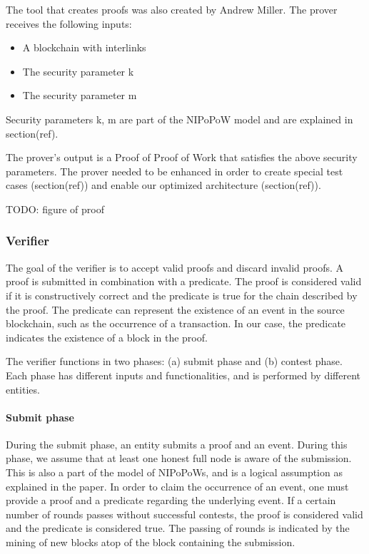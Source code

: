 The tool that creates proofs was also created by Andrew Miller. The
prover receives the following inputs:

\begin{itemize}
    \item
        A blockchain with interlinks
    \item
        The security parameter k
    \item
        The security parameter m
\end{itemize}

Security parameters k, m are part of the NIPoPoW model and are
explained in section(ref).

The prover’s output is a Proof of Proof of Work that satisfies the
above security parameters. The prover needed to be enhanced in order
to create special test cases (section(ref)) and enable our optimized
architecture (section(ref)).

TODO: figure of proof

\subsubsection{Verifier}

The goal of the verifier is to accept valid proofs and discard invalid
proofs. A proof is submitted in combination with a predicate. The
proof is considered valid if it is constructively correct and the
predicate is true for the chain described by the proof. The predicate
can represent the existence of an event in the source blockchain, such
as the occurrence of a transaction. In our case, the predicate
indicates the existence of a block in the proof.

The verifier functions in two phases: (a) submit phase and (b) contest
phase. Each phase has different inputs and functionalities, and is
performed by different entities.

\paragraph{Submit phase} During the submit phase, an entity submits a proof and
an event. During this phase, we assume that at least one honest full node is
aware of the submission. This is also a part of the model of NIPoPoWs, and is a
logical assumption as explained in the paper. In order to claim the occurrence
of an event, one must provide a proof and a predicate regarding the underlying
event. If a certain number of rounds passes without successful contests,
the proof is considered valid and the predicate is considered true. The passing
of rounds is indicated by the mining of new blocks atop of the block containing
the submission.


